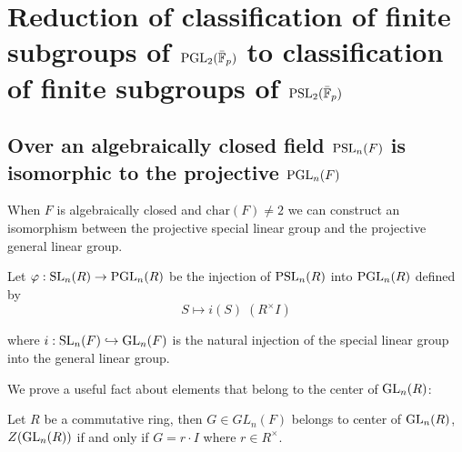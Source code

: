 \chapter{Reduction of classification of finite subgroups of $\operatorname{PGL}_2(\bar{\mathbb{F}}_p)$ to classification of finite subgroups of $\operatorname{PSL}_2(\bar{\mathbb{F}}_p)$}\label{Ch4_ReductionOfProblem}

\section{Over an algebraically closed field $\operatorname{PSL}_n(F)$ is isomorphic to the projective $\operatorname{PGL}_n(F)$}


When $F$ is algebraically closed and $\textrm{char}(F) \neq 2$ we can construct an isomorphism between the projective special linear group and the projective general linear group.
\begin{definition}
\label{SL_monoidHom_PGL}
\leanok
    Let $\varphi : \operatorname{SL}_n(R) \rightarrow \operatorname{PGL}_n(R)$ be the injection of $\operatorname{PSL}_n(R)$ into $\operatorname{PGL}_n(R)$ defined by
    \[
     S \mapsto i(S) \;  (R^\times I) 
    \]

    where $i : \operatorname{SL}_n(F) \hookrightarrow \operatorname{GL}_n(F)$ is the natural injection of the special linear group into the general linear group.
\end{definition}


We prove a useful fact about elements that belong to the center of $\operatorname{GL}_n(R)$:

\begin{lemma}
    \label{GeneralLinearGroup.Center.mem_center_general_linear_group_iff}
    Let $R$ be a commutative ring, then $G \in GL_n(F)$ belongs to center of $\operatorname{GL}_n(R)$, $Z(\operatorname{GL}_n(R))$ if and only if $G = r \cdot I$ where $r \in R^\times$.
    \end{lemma}
    
